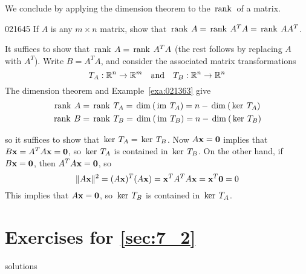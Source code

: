 \noindent We conclude by applying the dimension theorem to the $\thinspace\operatorname{rank\medspace}$ of a matrix.


\begin{example}{}{021645}
If $A$ is any $m \times n$ matrix, show that $\thinspace\operatorname{rank \medspace}A = \thinspace\operatorname{rank \medspace}A^{T}A = \thinspace\operatorname{rank \medspace}AA^{T}$.


\begin{solution}
  It suffices to show that $\thinspace\operatorname{rank \medspace}A = \thinspace\operatorname{rank \medspace}A^{T}A$ (the rest follows by replacing $A$ with $A^{T}$). Write $B = A^{T}A$, and consider the associated matrix transformations
\begin{equation*}
T_A : \mathbb{R}^n \to \mathbb{R}^m \quad \mbox{and} \quad T_B : \mathbb{R}^n \to \mathbb{R}^n
\end{equation*}
The dimension theorem and Example~\ref{exa:021363} give
\begin{align*}
\thinspace\operatorname{rank \medspace}A &= \thinspace\operatorname{rank \medspace}T_A = \thinspace\operatorname{dim\medspace}(\thinspace\operatorname{im \medspace}T_A) = n - \thinspace\operatorname{dim\medspace}(\thinspace\operatorname{ker \medspace}T_A) \\
\thinspace\operatorname{rank \medspace}B &= \thinspace\operatorname{rank \medspace}T_B = \thinspace\operatorname{dim\medspace}(\thinspace\operatorname{im \medspace}T_B) = n - \thinspace\operatorname{dim\medspace}(\thinspace\operatorname{ker \medspace}T_B)
\end{align*}

so it suffices to show that $\thinspace\operatorname{ker \medspace}T_{A} = \thinspace\operatorname{ker \medspace}T_{B}$. Now $A\textbf{x} = \textbf{0}$ implies that $B\textbf{x} = A^{T}A\textbf{x} = \textbf{0}$, so $\thinspace\operatorname{ker \medspace}T_{A}$ is contained in $\thinspace\operatorname{ker \medspace}T_{B}$. On the other hand, if $B\textbf{x} = \textbf{0}$, then $A^{T}A\textbf{x} = \textbf{0}$, so
\begin{equation*}
\| A\textbf{x} \|^2 = (A\textbf{x})^T(A\textbf{x}) = \textbf{x}^{T}A^{T}A\textbf{x} = \textbf{x}^T\textbf{0} = 0
\end{equation*}
This implies that $A\textbf{x} = \textbf{0}$, so $\thinspace\operatorname{ker \medspace}T_{B}$ is contained in $\thinspace\operatorname{ker \medspace}T_{A}$.
\end{solution}
\end{example}

\section*{Exercises for \ref{sec:7_2}}

\begin{Filesave}{solutions}
\end{Filesave}

